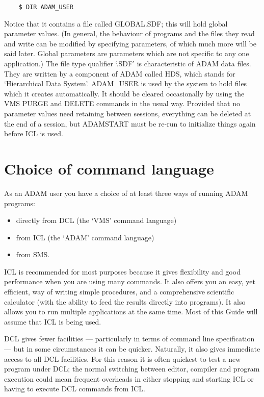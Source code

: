 \begin{small}
\begin{verbatim}
    $ DIR ADAM_USER
\end{verbatim}
\end{small}

Notice that it contains a file called GLOBAL.SDF; this will hold global
parameter values.
(In general, the behaviour of programs and the files they read and write can
be modified by specifying parameters, of which much more will be said later.
Global parameters are parameters which are not specific to any one application.)
The file type qualifier `.SDF' is characteristic of ADAM data files.
They are written by a component of ADAM called HDS, which stands for
`Hierarchical Data System'.
ADAM\_USER is used by the system to hold files which it creates automatically.
It should be cleared occasionally by using the VMS PURGE and DELETE commands
in the usual way.
Provided that no parameter values need retaining between sessions, everything
can be deleted at the end of a session, but ADAMSTART must be re-run to
initialize things again before ICL is used.

\section{Choice of command language}
\label{S_comlang}

As an ADAM user you have a choice of at least three ways of running ADAM
programs:
\begin{itemize}
\item directly from DCL (the `VMS' command language)
\item from ICL (the `ADAM' command language)
\item from SMS.
\end{itemize}
ICL is recommended for most purposes because it gives flexibility and good
performance when you are using many commands.
It also offers you an easy, yet efficient, way of writing simple procedures,
and a comprehensive scientific calculator (with the ability to feed the results
directly into programs).
It also allows you to run multiple applications at the same time.
Most of this Guide will assume that ICL is being used.

DCL gives fewer facilities --- particularly in terms of command line
specification --- but in some circumstances it can be quicker.
Naturally, it also gives immediate access to all DCL facilities.
For this reason it is often quickest to test a new program under DCL; the
normal switching between editor, compiler and program execution could mean
frequent overheads in either stopping and starting ICL or having to execute
DCL commands from ICL.

